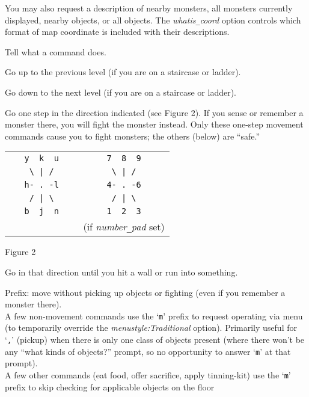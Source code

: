 You may also request a description of nearby monsters,
all monsters currently displayed, nearby objects, or all objects.
The
{\it whatis\verb+_+coord\/}
option controls which format of map coordinate is included with their
descriptions.
\item[\tb{\&}]
Tell what a command does.
\item[\tb{<}]
Go up to the previous level (if you are on a staircase or ladder).
\item[\tb{>}]
Go down to the next level (if you are on a staircase or ladder).
\item[\tb{[yuhjklbn]}]
Go one step in the direction indicated (see Figure 2).  If you sense
or remember
a monster there, you will fight the monster instead.  Only these
one-step movement commands cause you to fight monsters; the others
(below) are ``safe.''
\begin{center}
\begin{tabular}{cc}
\verb+   y  k  u   + & \verb+   7  8  9   +\\
\verb+    \ | /    + & \verb+    \ | /    +\\
\verb+   h- . -l   + & \verb+   4- . -6   +\\
\verb+    / | \    + & \verb+    / | \    +\\
\verb+   b  j  n   + & \verb+   1  2  3   +\\
                     & (if {\it number\verb+_+pad\/} set)
\end{tabular}
\end{center}
\begin{center}
Figure 2
\end{center}
\item[\tb{[YUHJKLBN]}]
Go in that direction until you hit a wall or run into something.
\item[\tb{m[yuhjklbn]}]
Prefix:  move without picking up objects or fighting (even if you remember
a monster there).\\
A few non-movement commands use the `{\tt m}' prefix to request operating
via menu (to temporarily override the
{\it menustyle:Traditional\/}
option).
Primarily useful for `{\tt ,}' (pickup) when there is only one class of
objects present (where there won't be any ``what kinds of objects?'' prompt,
so no opportunity to answer `{\tt m}' at that prompt).\\
A few other commands (eat food, offer sacrifice, apply tinning-kit) use
the `{\tt m}' prefix to skip checking for applicable objects on the floor
